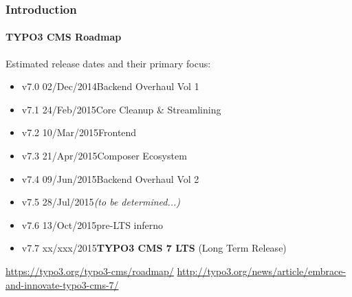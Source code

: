 
\begin{frame}[fragile]
	\frametitle{Introduction}
	\framesubtitle{TYPO3 CMS Roadmap}

	Estimated release dates and their primary focus:

	\begin{itemize}
		\item v7.0 \textrightarrow\tabto{1.3cm}02/Dec/2014\tabto{3.4cm}Backend Overhaul Vol 1

		\item
			\begingroup
				\color{typo3orange}
					v7.1 \textrightarrow\tabto{1.3cm}24/Feb/2015\tabto{3.4cm}Core Cleanup \& Streamlining
			\endgroup

		\item v7.2 \textrightarrow\tabto{1.3cm}10/Mar/2015\tabto{3.4cm}Frontend
		\item v7.3 \textrightarrow\tabto{1.3cm}21/Apr/2015\tabto{3.4cm}Composer Ecosystem
		\item v7.4 \textrightarrow\tabto{1.3cm}09/Jun/2015\tabto{3.4cm}Backend Overhaul Vol 2
		\item v7.5 \textrightarrow\tabto{1.3cm}28/Jul/2015\tabto{3.4cm}\textit{(to be determined...)}
		\item v7.6 \textrightarrow\tabto{1.3cm}13/Oct/2015\tabto{3.4cm}pre-LTS inferno
		\item v7.7 \textrightarrow\tabto{1.3cm}xx/xxx/2015\tabto{3.4cm}\textbf{TYPO3 CMS 7 LTS} (Long Term Release)
	\end{itemize}

	\smaller
		\url{https://typo3.org/typo3-cms/roadmap/}\newline
		\url{http://typo3.org/news/article/embrace-and-innovate-typo3-cms-7/}
	\normalsize

\end{frame}


